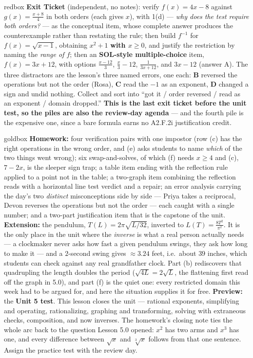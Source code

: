\documentclass[10pt]{article}
\begin{document}
\begin{skillbox}{redbox}
\textbf{Exit Ticket} (independent, no notes): verify $f(x)=4x-8$ against $g(x)=\frac{x+8}{4}$ in both
orders (each gives $x$), with 1(d) --- \emph{why does the test require both orders?} --- as the
conceptual item, whose complete answer produces the counterexample rather than restating the rule;
then build $f^{-1}$ for $f(x)=\sqrt{x-1}$, obtaining $x^{2}+1$ \textbf{with $x\ge0$}, and justify
the restriction by naming the \emph{range of $f$}; then an \textbf{SOL-style multiple-choice} item,
$f(x)=3x+12$, with options $\frac{x-12}{3}$, $\frac{x}{3}-12$, $\frac{1}{3x+12}$, and $3x-12$
(answer A). The three distractors are the lesson's three named errors, one each: \textbf{B} reversed
the operations but not the order (Rosa), \textbf{C} read the $-1$ as an exponent, \textbf{D} changed
a sign and undid nothing. Collect and sort into ``got it / order reversed / read as an exponent /
domain dropped.'' \textbf{This is the last exit ticket before the unit test, so the piles are also
the review-day agenda} --- and the fourth pile is the expensive one, since a bare formula earns no
A2.F.2i justification credit.
\end{skillbox}

\begin{skillbox}{goldbox}
\textbf{Homework:} four verification pairs with one impostor (row (c) has the right operations in the
wrong order, and (e) asks students to name \emph{which} of the two things went wrong); six
swap-and-solves, of which (f) needs $x\ge4$ and (c), $7-2x$, is the sleeper sign trap; a table item
ending with the reflection rule applied to a point not in the table; a two-graph item combining the
reflection reads with a horizontal line test verdict and a repair; an error analysis carrying the
day's two \emph{distinct} misconceptions side by side --- Priya takes a reciprocal, Devon reverses
the operations but not the order --- each caught with a single number; and a two-part justification
item that is the capstone of the unit. \textbf{Extension:} the pendulum, $T(L)=2\pi\sqrt{L/32}$,
inverted to $L(T)=\frac{8T^{2}}{\pi^{2}}$. It is the only place in the unit where the \emph{inverse}
is what a real person actually needs --- a clockmaker never asks how fast a given pendulum swings,
they ask how long to make it --- and a $2$-second swing gives $\approx3.24$ feet, i.e.\ about $39$
inches, which students can check against any real grandfather clock. Part (b) rediscovers that
quadrupling the length doubles the period ($\sqrt{4L}=2\sqrt{L}$, the flattening first read off the
graph in 5.0), and part (f) is the quiet one: every restricted domain this week had to be argued
for, and here the situation supplies it for free.
\textbf{Preview:} the \textbf{Unit 5 test}. This lesson closes the unit --- rational exponents,
simplifying and operating, rationalizing, graphing and transforming, solving with extraneous checks,
composition, and now inverses. The homework's closing note ties the whole arc back to the question
Lesson 5.0 opened: $x^{2}$ has two arms and $x^{3}$ has one, and every difference between $\sqrt{x}$
and $\sqrt[3]{x}$ follows from that one sentence. Assign the practice test with the review day.
\end{skillbox}
\end{document}
